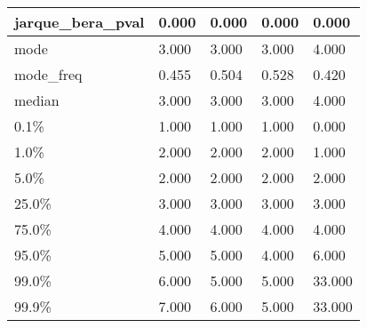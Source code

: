 \begin{table}[H]
\begin{tabular}{|l|m{10em}|m{10em}|m{10em}|m{10em}|}
\hline jarque\_bera\_pval & 0.000 & 0.000 & 0.000 & 0.000 \\
\hline mode & 3.000 & 3.000 & 3.000 & 4.000 \\
\hline mode\_freq & 0.455 & 0.504 & 0.528 & 0.420 \\
\hline median & 3.000 & 3.000 & 3.000 & 4.000 \\
\hline 0.1\% & 1.000 & 1.000 & 1.000 & 0.000 \\
\hline 1.0\% & 2.000 & 2.000 & 2.000 & 1.000 \\
\hline 5.0\% & 2.000 & 2.000 & 2.000 & 2.000 \\
\hline 25.0\% & 3.000 & 3.000 & 3.000 & 3.000 \\
\hline 75.0\% & 4.000 & 4.000 & 4.000 & 4.000 \\
\hline 95.0\% & 5.000 & 5.000 & 4.000 & 6.000 \\
\hline 99.0\% & 6.000 & 5.000 & 5.000 & 33.000 \\
\hline 99.9\% & 7.000 & 6.000 & 5.000 & 33.000 \\
\hline
\end{tabular}
\end{table}

